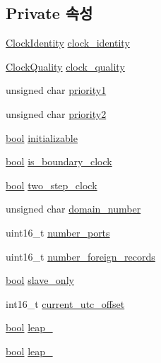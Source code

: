 \subsection*{Private 속성}
\begin{DoxyCompactItemize}
\item 
\hyperlink{class_clock_identity}{Clock\+Identity} \hyperlink{class_i_e_e_e1588_clock_a8f1bca06e21478283b96e81ef3ba266a}{clock\+\_\+identity}
\item 
\hyperlink{struct_clock_quality}{Clock\+Quality} \hyperlink{class_i_e_e_e1588_clock_aca3c1cfd540c15574df0890efc980cbe}{clock\+\_\+quality}
\item 
unsigned char \hyperlink{class_i_e_e_e1588_clock_aaaa084057ac150d5cfeaff1ccee422b8}{priority1}
\item 
unsigned char \hyperlink{class_i_e_e_e1588_clock_a726134dcd45a308e0e84419c09793ed3}{priority2}
\item 
\hyperlink{avb__gptp_8h_af6a258d8f3ee5206d682d799316314b1}{bool} \hyperlink{class_i_e_e_e1588_clock_a49068a4e8e94f167fce86bfc7af15584}{initializable}
\item 
\hyperlink{avb__gptp_8h_af6a258d8f3ee5206d682d799316314b1}{bool} \hyperlink{class_i_e_e_e1588_clock_a5ea5bb551c4b1e35c703172cc7702e37}{is\+\_\+boundary\+\_\+clock}
\item 
\hyperlink{avb__gptp_8h_af6a258d8f3ee5206d682d799316314b1}{bool} \hyperlink{class_i_e_e_e1588_clock_a4bfd082080c406f15069386b6d26d7c3}{two\+\_\+step\+\_\+clock}
\item 
unsigned char \hyperlink{class_i_e_e_e1588_clock_a7a6e97f0620fb70776c613bdbd0763d8}{domain\+\_\+number}
\item 
uint16\+\_\+t \hyperlink{class_i_e_e_e1588_clock_a4d6442f37a5e72ab47510123acc202b5}{number\+\_\+ports}
\item 
uint16\+\_\+t \hyperlink{class_i_e_e_e1588_clock_acd14be310d9887f8738ed0e47589bbb7}{number\+\_\+foreign\+\_\+records}
\item 
\hyperlink{avb__gptp_8h_af6a258d8f3ee5206d682d799316314b1}{bool} \hyperlink{class_i_e_e_e1588_clock_a01957b2e8226d4eeef1bae5277cc51f4}{slave\+\_\+only}
\item 
int16\+\_\+t \hyperlink{class_i_e_e_e1588_clock_a01afaec5cd4deeb3a2ffb210ef83d50f}{current\+\_\+utc\+\_\+offset}
\item 
\hyperlink{avb__gptp_8h_af6a258d8f3ee5206d682d799316314b1}{bool} \hyperlink{class_i_e_e_e1588_clock_a05870a92432a902b7451f6de8578838f}{leap\+\_}
\item 
\hyperlink{avb__gptp_8h_af6a258d8f3ee5206d682d799316314b1}{bool} \hyperlink{class_i_e_e_e1588_clock_a4de4b1da3e9662155b161e623b0bf2be}{leap\+\_}

\end{DoxyCompactItemize}
